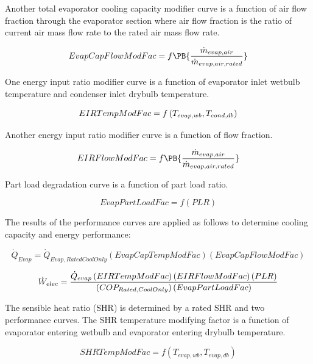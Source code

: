Another total evaporator cooling capacity modifier curve is a function of air flow fraction through the evaporator section where air flow fraction is the ratio of current air mass flow rate to the rated air mass flow rate.

\begin{equation}
  EvapCapFlowModFac = f\PB{\frac{\dot{m}_{evap,air}}{\dot{m}_{evap,air,rated}}}
\end{equation}

One energy input ratio modifier curve is a function of evaporator inlet wetbulb temperature and condenser inlet drybulb temperature.

\begin{equation}
EIRTempModFac = f\left( {{T_{evap,wb}},{\rm{}}{T_{cond,db}}} \right)
\end{equation}

Another energy input ratio modifier curve is a function of flow fraction.

\begin{equation}
  EIRFlowModFac = f\PB{\frac{\dot{m}_{evap,air}}{\dot{m}_{evap,air,rated}}}
\end{equation}

Part load degradation curve is a function of part load ratio.

\begin{equation}
EvapPartLoadFac = f\left( {PLR} \right)
\end{equation}

The results of the performance curves are applied as follows to determine cooling capacity and energy performance:

\begin{equation}
{\dot Q_{Evap}} = {\dot Q_{Evap,RatedCoolOnly}}\left( {EvapCapTempModFac} \right)\left( {EvapCapFlowModFac} \right)
\end{equation}

\begin{equation}
{\dot W_{elec}} = \frac{{{{\dot Q}_{evap}}\left( {EIRTempModFac} \right)\left( {EIRFlowModFac} \right)\left( {PLR} \right)}}{{\left( {CO{P_{Rated,{\rm{}}CoolOnly}}} \right)\left( {EvapPartLoadFac} \right)}}
\end{equation}

The sensible heat ratio (SHR) is determined by a rated SHR and two performance curves. The SHR temperature modifying factor is a function of evaporator entering wetbulb and evaporator entering drybulb temperature.

\begin{equation}
SHRTempModFac = f\left( {{T_{evap,wb}},{T_{evap,db}}} \right)
\end{equation}

